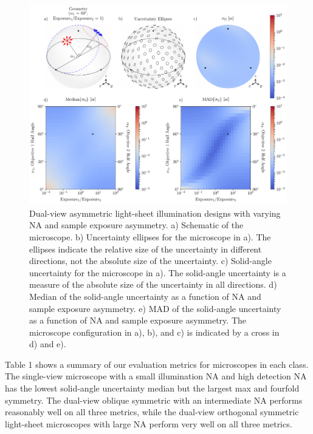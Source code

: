 \documentclass[10pt]{article}
\begin{document}
\begin{figure}[htbp]
  \centering\includegraphics[width=\textwidth]{asymmetric-double}
  \caption{Dual-view asymmetric light-sheet illumination designs with varying NA
    and sample exposure asymmetry. a) Schematic of the microscope. b)
    Uncertainty ellipses for the microscope in a). The ellipses indicate the
    relative size of the uncertainty in different directions, not the absolute
    size of the uncertainty. c) Solid-angle uncertainty for the microscope in
    a). The solid-angle uncertainty is a measure of the absolute size of the
    uncertainty in all directions. d) Median of the solid-angle uncertainty as a
    function of NA and sample exposure asymmetry. e) MAD of the solid-angle
    uncertainty as a function of NA and sample exposure asymmetry. The
    microscope configuration in a), b), and c) is indicated by a cross in d) and e).}
\label{fig:asymmetric-double}
\end{figure}

Table 1 shows a summary of our evaluation metrics for microscopes in each
class. The single-view microscope with a small illumination NA and high
detection NA has the lowest solid-angle uncertainty median but the largest max
and fourfold symmetry. The dual-view oblique symmetric with an
intermediate NA performs reasonably well on all three metrics, while the
dual-view orthogonal symmetric light-sheet microscopes with large NA perform
very well on all three metrics.
\end{document}
